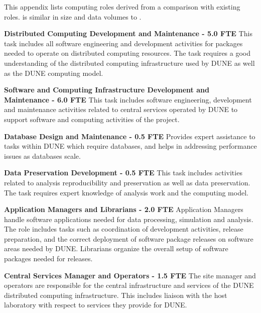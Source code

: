 \label{comp-roles}

This appendix lists computing roles derived from a comparison with existing  roles.   is similar in size and data volumes to . 

\begin{description}


\item {\bf Distributed Computing Development and Maintenance - 5.0 FTE}
This task includes all software engineering and development activities for packages needed to operate on distributed computing resources. The task requires a good understanding of the distributed computing infrastructure used by DUNE as well as the DUNE computing model.%

\item {\bf Software and Computing Infrastructure Development and Maintenance - 6.0 FTE}
This task includes software engineering, development and maintenance activities related to central services operated by DUNE to support software and computing activities of the project.   %

\item {\bf Database Design and Maintenance - 0.5 FTE}
Provides expert assistance to tasks within DUNE which require databases, and helps in addressing performance issues as databases scale. %

\item {\bf Data Preservation Development - 0.5 FTE}
This task includes activities related to analysis reproducibility and preservation as well as data preservation. The task requires expert knowledge of analysis work and the computing model. %

\item {\bf Application Managers and Librarians - 2.0 FTE}
Application Managers handle software applications needed for data processing, simulation and analysis. The role includes tasks such as coordination of development activities, release preparation, and the correct deployment of software package releases on software areas needed by DUNE. Librarians organize the overall setup of software packages needed for releases. %

\item {\bf Central Services Manager and Operators - 1.5 FTE}
The site manager and operators are responsible for the central infrastructure and services of the DUNE distributed computing infrastructure. This includes liaison with the host laboratory with respect to services they provide for DUNE. %


\end{description}
